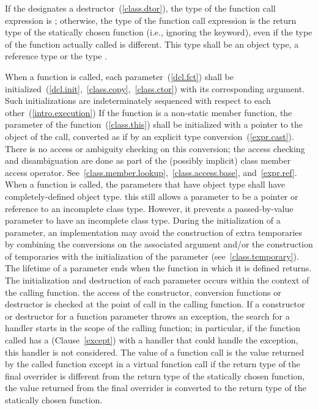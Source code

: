 \pnum
If the  designates a destructor~(\ref{class.dtor}),
the type of the function call expression is ; otherwise, the
type of the function call expression is the return type of the
statically chosen function (i.e., ignoring the  keyword),
even if the type of the function actually called is different.
%
This type shall be an object type, a reference type or the type
.

\pnum
{}%
%
%
%
When a function is called, each parameter~(\ref{dcl.fct}) shall be
initialized~(\ref{dcl.init},~\ref{class.copy},~\ref{class.ctor}) with
its corresponding argument.
\enternote Such initializations are indeterminately sequenced
with respect to each other~(\ref{intro.execution}) \exitnote
If the function is a non-static member
function, the  parameter of the function~(\ref{class.this})
shall be initialized with a pointer to the object of the call, converted
as if by an explicit type conversion~(\ref{expr.cast}).
\enternote 
There is no access or ambiguity checking on this conversion; the access
checking and disambiguation are done as part of the (possibly implicit)
class member access operator.
See~\ref{class.member.lookup},~\ref{class.access.base},
and~\ref{expr.ref}.
\exitnote 
When a function is called, the parameters that have object type shall
have completely-defined object type.
\enternote 
this still allows a parameter to be a pointer or reference to an
incomplete class type. However, it prevents a passed-by-value parameter
to have an incomplete class type.
\exitnote 
During the initialization of a parameter, an implementation may avoid
the construction of extra temporaries by combining the conversions on
the associated argument and/or the construction of temporaries with the
initialization of the parameter (see~\ref{class.temporary}). The
lifetime of a parameter ends when the function in which it is defined
returns. The initialization and destruction of each parameter occurs
within the context of the calling function.
\enterexample 
the access of the constructor, conversion functions or destructor is
checked at the point of call in the calling function. If a constructor
or destructor for a function parameter throws an exception, the search
for a handler starts in the scope of the calling function; in
particular, if the function called has a 
(Clause~\ref{except}) with a handler that could handle the exception,
this handler is not considered.
\exitexample 
The value of a function call is the value returned by the called
function except in a virtual function call if the return type of the
final overrider is different from the return type of the statically
chosen function, the value returned from the final overrider is
converted to the return type of the statically chosen function.

